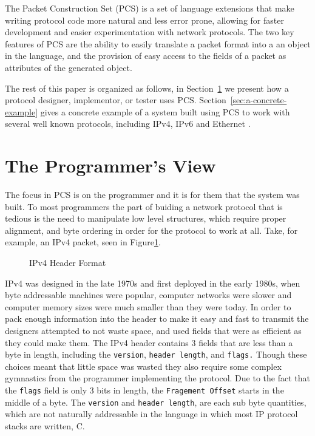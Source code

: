 \documentclass{sig-alternate-10pt}
\begin{document}
The Packet Construction Set (PCS) is a set of language extensions that
make writing protocol code more natural and less error prone, allowing
for faster development and easier experimentation with network
protocols.  The two key features of PCS are the ability to easily
translate a packet format into a an object in the language, and the
provision of easy access to the fields of a packet as attributes of
the generated object.

The rest of this paper is organized as follows, in
Section~\ref{sec:the-programmers-view} we present how a protocol
designer, implementor, or tester uses PCS.
Section~\ref{sec:a-concrete-example} gives a concrete example of a
system built using PCS to work with several well known protocols,
including IPv4\cite{rfc791}, IPv6\cite{rfc2460} and Ethernet \cite{}.

\section{The Programmer's View}
\label{sec:the-programmers-view}

The focus in PCS is on the programmer and it is for them that the
system was built.  To most programmers the part of buiding a network
protocol that is tedious is the need to manipulate low level
structures, which require proper alignment, and byte ordering in order
for the protocol to work at all.  Take, for example, an IPv4 packet,
seen in Figure\ref{fig:rfc791-ipheader}.

\begin{figure}
\label{fig:rfc791-ipheader}

  \caption{IPv4 Header Format}
\end{figure}

IPv4 was designed in the late 1970s and first deployed in the early
1980s, when byte addressable machines were popular, computer networks
were slower and computer memory sizes were much smaller than they were
today.  In order to pack enough information into the header to make it
easy and fast to transmit the designers attempted to not waste space,
and used fields that were as efficient as they could make them.  The
IPv4 header contains 3 fields that are less than a byte in length,
including the \verb|version|, \verb|header length|, and \verb|flags.|
Though these choices meant that little space was wasted they also
require some complex gymnastics from the programmer implementing the
protocol.  Due to the fact that the \verb|flags| field is only 3 bits
in length, the \verb|Fragement Offset| starts in the middle of a
byte.  The \verb|version| and \verb|header length|, are each sub byte
quantities, which are not naturally addressable in the language in
which most IP protocol stacks are written, C.
\end{document}
